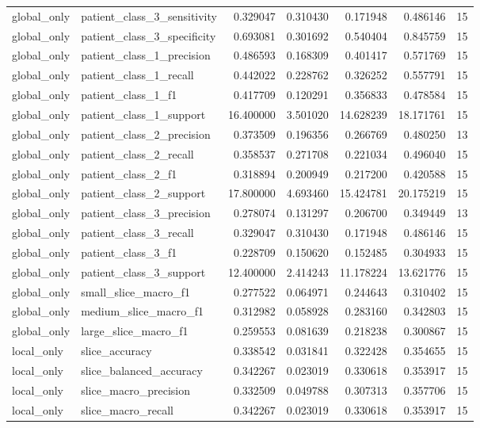 \begin{tabular}{llrrrrr}
global_only & patient_class_3_sensitivity & 0.329047 & 0.310430 & 0.171948 & 0.486146 & 15 \\
global_only & patient_class_3_specificity & 0.693081 & 0.301692 & 0.540404 & 0.845759 & 15 \\
global_only & patient_class_1_precision & 0.486593 & 0.168309 & 0.401417 & 0.571769 & 15 \\
global_only & patient_class_1_recall & 0.442022 & 0.228762 & 0.326252 & 0.557791 & 15 \\
global_only & patient_class_1_f1 & 0.417709 & 0.120291 & 0.356833 & 0.478584 & 15 \\
global_only & patient_class_1_support & 16.400000 & 3.501020 & 14.628239 & 18.171761 & 15 \\
global_only & patient_class_2_precision & 0.373509 & 0.196356 & 0.266769 & 0.480250 & 13 \\
global_only & patient_class_2_recall & 0.358537 & 0.271708 & 0.221034 & 0.496040 & 15 \\
global_only & patient_class_2_f1 & 0.318894 & 0.200949 & 0.217200 & 0.420588 & 15 \\
global_only & patient_class_2_support & 17.800000 & 4.693460 & 15.424781 & 20.175219 & 15 \\
global_only & patient_class_3_precision & 0.278074 & 0.131297 & 0.206700 & 0.349449 & 13 \\
global_only & patient_class_3_recall & 0.329047 & 0.310430 & 0.171948 & 0.486146 & 15 \\
global_only & patient_class_3_f1 & 0.228709 & 0.150620 & 0.152485 & 0.304933 & 15 \\
global_only & patient_class_3_support & 12.400000 & 2.414243 & 11.178224 & 13.621776 & 15 \\
global_only & small_slice_macro_f1 & 0.277522 & 0.064971 & 0.244643 & 0.310402 & 15 \\
global_only & medium_slice_macro_f1 & 0.312982 & 0.058928 & 0.283160 & 0.342803 & 15 \\
global_only & large_slice_macro_f1 & 0.259553 & 0.081639 & 0.218238 & 0.300867 & 15 \\
local_only & slice_accuracy & 0.338542 & 0.031841 & 0.322428 & 0.354655 & 15 \\
local_only & slice_balanced_accuracy & 0.342267 & 0.023019 & 0.330618 & 0.353917 & 15 \\
local_only & slice_macro_precision & 0.332509 & 0.049788 & 0.307313 & 0.357706 & 15 \\
local_only & slice_macro_recall & 0.342267 & 0.023019 & 0.330618 & 0.353917 & 15 \\

\end{tabular}
